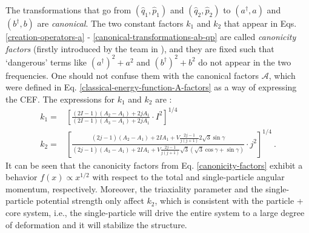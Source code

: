 The transformations that go from $(\hat{q}_1,\hat{p}_1)$ and $(\hat{q}_2,\hat{p}_2)$ to $(a^\dagger, a)$ and $(b^\dagger, b)$ are \emph{canonical}. The two constant factors $k_1$ and $k_2$ that appear in Eqs. \ref{creation-operators-a} - \ref{canonical-transformations-ab-qp} are called \emph{canonicity factors} (firstly introduced by the team in \cite{raduta2017semiclassical}), and they are fixed such that `dangerous' terms like $(a^\dagger)^2+a^2$ and $(b^\dagger)^2+b^2$ do not appear in the two frequencies. One should not confuse them with the canonical factors $\mathcal{A}$, which were defined in Eq. \ref{classical-energy-function-A-factors} as a way of expressing the CEF. The expressions for $k_1$ and $k_2$ are \cite{raduta2020approach}:
\begin{align}
    k_1=&\left[\frac{(2I-1)(A_2-A_1)+2jA_1}{(2I-1)(A_3-A_1)+2jA_1}\cdot I^2\right]^{1/4}\, \nonumber\\
    k_2=&\left[\frac{(2j-1)(A_2-A_1)+2IA_1+V\frac{2j-1}{j(j+1)}2\sqrt{3}\sin\gamma}{(2j-1)(A_3-A_1)+2IA_1+V\frac{2j-1}{j(j+1)}\sqrt{3}\left(\sqrt{3}\cos\gamma+\sin\gamma\right)}\cdot j^2\right]^{1/4}\ .
    \label{canonicity-factors}
\end{align}
It can be seen that the canonicity factors from Eq. \ref{canonicity-factors} exhibit a behavior $f(x)\propto x^{1/2}$ with respect to the total and single-particle angular momentum, respectively. Moreover, the triaxiality parameter and the single-particle potential strength only affect $k_2$, which is consistent with the particle + core system, i.e., the single-particle will drive the entire system to a large degree of deformation and it will stabilize the structure.

